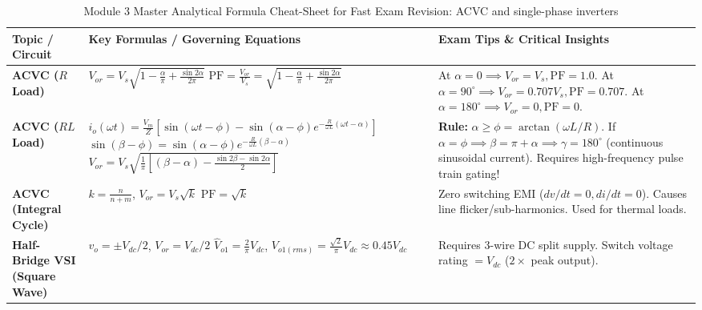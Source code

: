 \documentclass[11pt,a4paper]{article}
\begin{document}
\begin{table}[htbp]
\centering
\small
\caption{Module 3 Master Analytical Formula Cheat-Sheet for Fast Exam Revision: ACVC and single-phase inverters}
\label{tab:module3_master_formulas}
\begin{tabularx}{\textwidth}{l p{5.5cm} X}
\toprule
\textbf{Topic / Circuit} & \textbf{Key Formulas / Governing Equations} & \textbf{Exam Tips \& Critical Insights} \\
\midrule
\textbf{ACVC ($R$ Load)} &
$V_{or} = V_s \sqrt{1 - \frac{\alpha}{\pi} + \frac{\sin 2\alpha}{2\pi}}$ \newline
$\text{PF} = \frac{V_{or}}{V_s} = \sqrt{1 - \frac{\alpha}{\pi} + \frac{\sin 2\alpha}{2\pi}}$ &
At $\alpha=0 \implies V_{or}=V_s, \text{PF}=1.0$. \newline
At $\alpha=90^\circ \implies V_{or}=0.707 V_s, \text{PF}=0.707$. \newline
At $\alpha=180^\circ \implies V_{or}=0, \text{PF}=0$. \\
\midrule
\textbf{ACVC ($RL$ Load)} &
$i_o(\omega t) = \frac{V_m}{Z}[\sin(\omega t-\phi) - \sin(\alpha-\phi)e^{-\frac{R}{\omega L}(\omega t-\alpha)}]$ \newline
$\sin(\beta-\phi) = \sin(\alpha-\phi)e^{-\frac{R}{\omega L}(\beta-\alpha)}$ \newline
$V_{or} = V_s \sqrt{\frac{1}{\pi}[(\beta-\alpha) - \frac{\sin 2\beta - \sin 2\alpha}{2}]}$ &
\textbf{Rule:} $\alpha \ge \phi = \arctan(\omega L / R)$. \newline
If $\alpha = \phi \implies \beta = \pi + \alpha \implies \gamma = 180^\circ$ (continuous sinusoidal current). \newline
Requires high-frequency pulse train gating! \\
\midrule
\textbf{ACVC (Integral Cycle)} &
$k = \frac{n}{n+m}$, \quad $V_{or} = V_s \sqrt{k}$ \newline
$\text{PF} = \sqrt{k}$ &
Zero switching EMI ($dv/dt=0, di/dt=0$). \newline
Causes line flicker/sub-harmonics. Used for thermal loads. \\
\midrule
\textbf{Half-Bridge VSI (Square Wave)} &
$v_o = \pm V_{dc}/2$, \quad $V_{or} = V_{dc}/2$ \newline
$\hat{V}_{o1} = \frac{2}{\pi}V_{dc}$, \quad $V_{o1(rms)} = \frac{\sqrt{2}}{\pi}V_{dc} \approx 0.45 V_{dc}$ &
Requires 3-wire DC split supply. \newline
Switch voltage rating $= V_{dc}$ ($2 \times$ peak output). \\

\end{tabularx}
\end{table}
\end{document}
